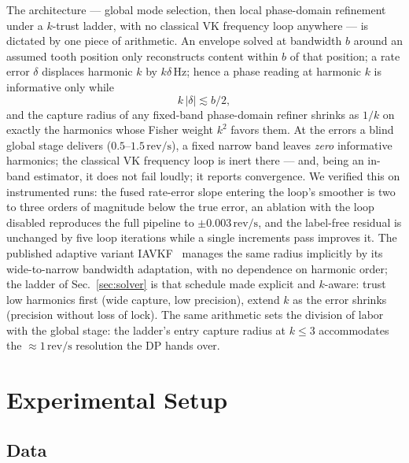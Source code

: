\documentclass[journal]{IEEEtran}
\newcommand{\revps}{\ensuremath{\,\mathrm{rev/s}}}
\begin{document}
The architecture --- global mode selection, then local phase-domain
refinement under a $k$-trust ladder, with no classical VK frequency loop
anywhere --- is dictated by one piece of arithmetic. An envelope solved
at bandwidth $b$ around an assumed tooth position only reconstructs
content within $b$ of that position; a rate error $\delta$ displaces
harmonic $k$ by $k\delta$\,Hz; hence a phase reading at harmonic $k$ is
informative only while
\begin{equation}
  k\,|\delta| \lesssim b/2,
  \label{eq:basin}
\end{equation}
and the capture radius of any fixed-band phase-domain refiner shrinks as
$1/k$ on exactly the harmonics whose Fisher weight $k^2$ favors them.
At the errors a blind global stage delivers ($0.5$--$1.5\revps$), a
fixed narrow band leaves \emph{zero} informative harmonics; the
classical VK frequency loop is inert there --- and, being an in-band
estimator, it does not fail loudly; it reports convergence. We verified
this on instrumented runs: the fused rate-error slope entering the loop's
smoother is two to three orders of magnitude below the true error, an
ablation with the loop disabled reproduces the full pipeline to
$\pm0.003\revps$, and the label-free residual is unchanged by five loop
iterations while a single increments pass improves it. The published
adaptive variant IAVKF~\cite{jiang2024iavkf} manages the same radius
implicitly by its wide-to-narrow bandwidth adaptation, with no
dependence on harmonic order; the ladder of Sec.~\ref{sec:solver} is
that schedule made explicit and $k$-aware: trust low harmonics first
(wide capture, low precision), extend $k$ as the error shrinks
(precision without loss of lock). The same arithmetic sets the division
of labor with the global stage: the ladder's entry capture radius at
$k \le 3$ accommodates the $\approx 1\revps$ resolution the DP hands
over.

\section{Experimental Setup}
\label{sec:setup}

\subsection{Data}
\label{sec:data}
\end{document}
